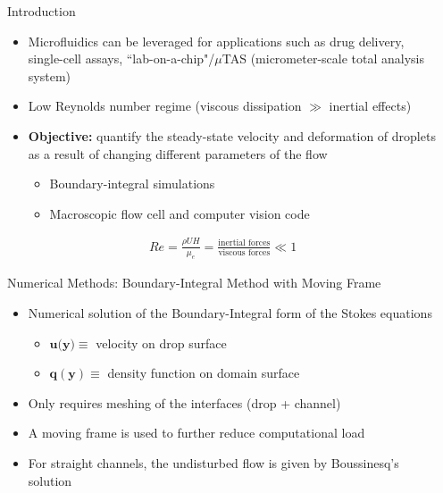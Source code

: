 \documentclass[final]{beamer}
\newlength{\sepwidth}
\newlength{\colwidth}
\newcommand{\separatorcolumn}{\begin{column}{\sepwidth}\end{column}}
\begin{document}
\begin{frame}[t]
\begin{columns}[t]
\separatorcolumn

\begin{column}{\colwidth}

  \begin{block}{Introduction}

    \begin{itemize}
        \item Microfluidics can be leveraged for applications such as drug delivery, single-cell assays, ``lab-on-a-chip"/$\mu$TAS (micrometer-scale total analysis system)
        \item Low Reynolds number regime (viscous dissipation $\gg$ inertial effects)
        \item \textbf{Objective:} quantify the steady-state velocity and deformation of droplets as a result of changing different parameters of the flow
        \begin{itemize}
            \item Boundary-integral simulations
            \item Macroscopic flow cell and computer vision code
        \end{itemize}

    \end{itemize}
    \begin{align*}
        Re = \frac{\rho UH}{\mu_e} = \frac{\text{inertial forces}}{\text{viscous forces}} \ll 1
    \end{align*}

  \end{block}

  \begin{block}{Numerical Methods: Boundary-Integral Method with Moving Frame}
    \begin{itemize}
        \item Numerical solution of the Boundary-Integral form of the Stokes equations
        \begin{itemize}
            \item  $\boldsymbol{u(\boldsymbol{y}}) \equiv$ velocity on drop surface
            \item $\boldsymbol{q}(\boldsymbol{y}) \equiv$ density function on domain surface
        \end{itemize}
        \item Only requires meshing of the interfaces (drop + channel)
        \item A moving frame is used to further reduce computational load
        \item For straight channels, the undisturbed flow is given by Boussinesq's solution
    \end{itemize}   
    \begin{columns}
        \small
        \begin{column}{.45\textwidth} %


\end{column}
\end{columns}
\end{block}
\end{column}
\end{columns}
\end{frame}
\end{document}
